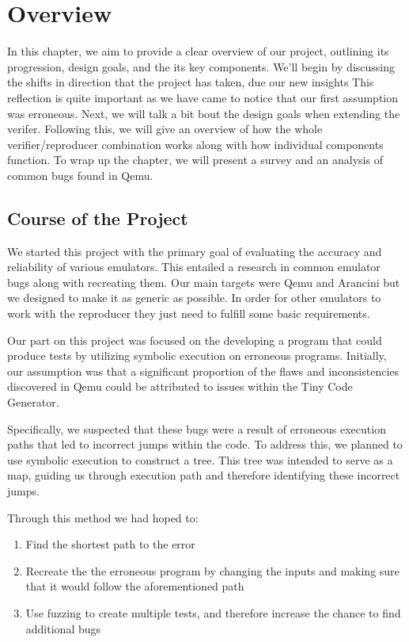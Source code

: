 
\chapter{Overview}\label{chapter:overview}
In this chapter, we aim to provide a clear overview of our project, outlining its progression, design goals, and the its key components.
We'll begin by discussing the shifts in direction that the project has taken, due our new insights
This reflection is quite important as we have came to notice that our first assumption was erroneous.
Next, we will talk a bit bout the design goals when extending the verifer.
Following this, we will give an overview of how the whole verifier/reproducer combination works along with how individual components function.
To wrap up the chapter, we will present a survey and an analysis of common bugs found in Qemu.

\section{Course of the Project}
We started this project with the primary goal of evaluating the accuracy and reliability of various emulators.
This entailed a research in common emulator bugs along with recreating them.
Our main targets were Qemu and Arancini but we designed to make it as generic as possible.
In order for other emulators to work with the reproducer they just need to fulfill some basic requirements.

Our part on this project was focused on the developing a program that could produce tests by utilizing symbolic execution on erroneous programs.
Initially, our assumption was that a significant proportion of the flaws and inconsistencies discovered in Qemu could be attributed to issues within the Tiny Code Generator.

Specifically, we suspected that these bugs were a result of erroneous execution paths that led to incorrect jumps within the code. To address this, we planned to use symbolic execution to construct a tree.
This tree was intended to serve as a map, guiding us through execution path and therefore identifying these incorrect jumps.

Through this method we had hoped to:
\begin{enumerate}[label=(\Alph*)]
   \item Find the shortest path to the error
   \item Recreate the the erroneous program by changing the inputs and making sure that it would follow the aforementioned path
   \item Use fuzzing to create multiple tests, and therefore increase the chance to find additional bugs
\end{enumerate}

